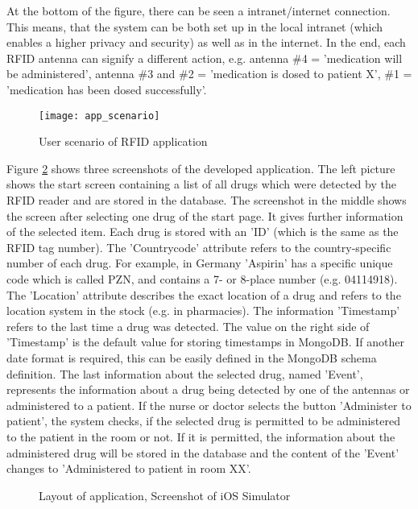 At the bottom of the figure, there can be seen a intranet/internet connection. This means, that the system can be both set up in the local intranet (which enables a higher privacy and security) as well as in the internet. In the end, each RFID antenna can signify a different action, e.g. antenna \#4 = 'medication will be administered', antenna \#3 and \#2 = 'medication is dosed to patient X', \#1 = 'medication has been dosed successfully'.

\begin{figure}
\centering
\texttt{[image: app\_scenario]} 
\caption{\label{fig:appfunctionality}User scenario of RFID application} 
\end{figure}

Figure \ref{fig:app_screenshot} shows three screenshots of the developed application. The left picture shows the start screen containing a list of all drugs which were detected by the RFID reader and are stored in the database. The screenshot in the middle shows the screen after selecting one drug of the start page. It gives further information of the selected item. Each drug is stored with an 'ID' (which is the same as the RFID tag number). The 'Countrycode' attribute refers to the country-specific number of each drug. For example, in Germany 'Aspirin' has a specific unique code which is called \ac{PZN}, and contains a 7- or 8-place number (e.g. 04114918). The 'Location' attribute describes the exact location of a drug and refers to the location system in the stock (e.g. in pharmacies). The information 'Timestamp' refers to the last time a drug was detected. The value on the right side of 'Timestamp' is the default value for storing timestamps in MongoDB. If another date format is required, this can be easily defined in the MongoDB schema definition. The last information about the selected drug, named 'Event', represents the information about a drug being detected by one of the antennas or administered to a patient. If the nurse or doctor selects the button 'Administer to patient', the system checks, if the selected drug is permitted to be administered to the patient in the room or not. If it is permitted, the information about the administered drug will be stored in the database and the content of the 'Event' changes to 'Administered to patient in room XX'.

\begin{figure}
\centering
{}
\caption{\label{fig:app_screenshot}Layout of application, Screenshot of iOS Simulator}
\end{figure}

